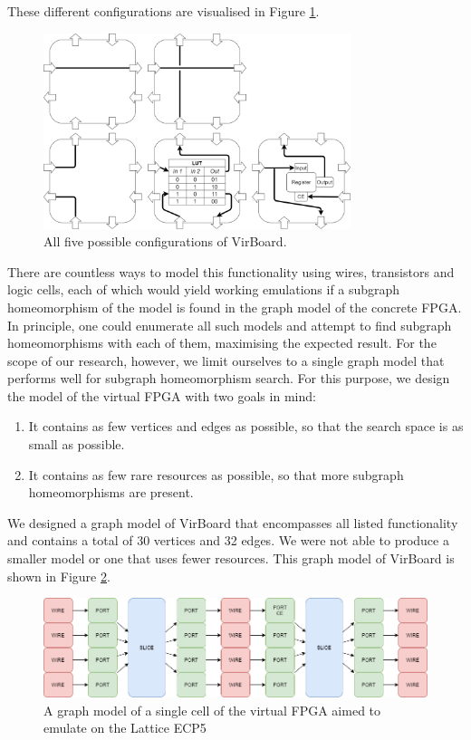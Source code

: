 These different configurations are visualised in Figure \ref{fig:virboardconfigs}.

\begin{figure}
\centering
\includegraphics[width=0.8\textwidth]{images/virboard.png}
\caption{All five possible configurations of VirBoard.}
\label{fig:virboardconfigs}
\end{figure}	

There are countless ways to model this functionality using wires, transistors and logic cells, each of which would yield working emulations if a subgraph homeomorphism of the model is found in the graph model of the concrete FPGA. In principle, one could enumerate all such models and attempt to find subgraph homeomorphisms with each of them, maximising the expected result. For the scope of our research, however, we limit ourselves to a single graph model that performs well for subgraph homeomorphism search. For this purpose, we design the model of the virtual FPGA with two goals in mind:

\begin{enumerate}
\item It contains as few vertices and edges as possible, so that the search space is as small as possible.
\item It contains as few rare resources as possible, so that more subgraph homeomorphisms are present.
\end{enumerate}

We designed a graph model of VirBoard that encompasses all listed functionality and contains a total of 30 vertices and 32 edges. We were not able to produce a smaller model or one that uses fewer resources. This graph model of VirBoard is shown in Figure \ref{fig:virboard}.



\begin{figure}
\centering
\includegraphics[width=\textwidth]{images/virtualFPGA2.png}
\caption{A graph model of a single cell of the virtual FPGA aimed to emulate on the Lattice ECP5}
\label{fig:virboard}
\end{figure}	

